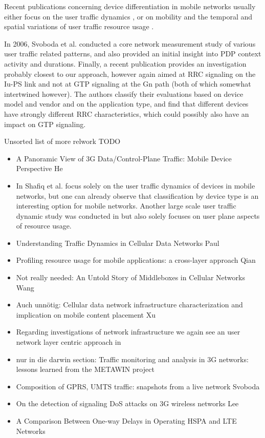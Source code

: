 Recent publications concerning device differentiation in mobile networks usually either focus on the user traffic dynamics \cite{shafiq2011characterizing}, or on mobility and the temporal and spatial variations of user traffic resource usage  \cite{paul2011understanding}.

In 2006, Svoboda et al. \cite{svoboda2006composition} conducted a core network measurement study of various user traffic related patterns, and also provided an initial insight into \ac{PDP} context activity and durations. Finally, a recent publication \cite{he2012panoramic} provides an investigation probably closest to our approach, however again aimed at \ac{RRC} signaling on the Iu-PS link and not at \ac{GTP} signaling at the Gn path (both of which somewhat intertwined however). The authors classify their evaluations based on device model and vendor and on the application type, and find that different devices have strongly different \ac{RRC} characteristics, which could possibly also have an impact on \ac{GTP} signaling.


Unsorted list of more relwork TODO
\begin{itemize}
\item A Panoramic View of 3G Data/Control-Plane Traffic: Mobile Device Perspective He \cite{he2012panoramic}

\item In \cite{shafiq2011characterizing} Shafiq et al. focus solely on the user traffic dynamics of devices in mobile networks, but one can already observe that classification by device type is an interesting option for mobile networks. Another large scale user traffic dynamic study was conducted in \cite{paul2011understanding} but also solely focuses on user plane aspects of resource usage.

\item Understanding Traffic Dynamics in Cellular Data Networks Paul \cite{paul2011understanding}
\item Profiling resource usage for mobile applications: a cross-layer approach Qian \cite{qian2011profiling}
\item Not really needed: An Untold Story of Middleboxes in Cellular Networks Wang \cite{wang2011untold}
\item Auch unnötig: Cellular data network infrastructure characterization and implication on mobile content placement Xu\cite{Xu:2011:CDN:2007116.2007149}
\item Regarding investigations of network infrastructure we again see an user network layer centric approach in \cite{Xu:2011:CDN:2007116.2007149}
\item nur in die darwin section: Traffic monitoring and analysis in 3G networks: lessons learned from the METAWIN project \cite{ricciato2006traffic}
\item Composition of GPRS, UMTS traffic: snapshots from a live network Svoboda \cite{svoboda2006composition}
\item On the detection of signaling DoS attacks on 3G wireless networks Lee \cite{lee2007detection}
\item A Comparison Between One-way Delays in Operating HSPA and LTE Networks \cite{laner2012delaycomparison}
\end{itemize}



